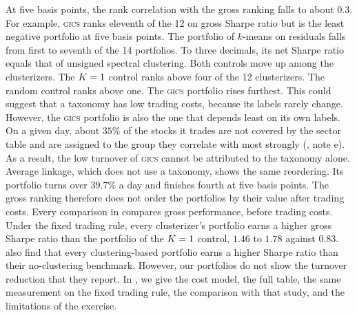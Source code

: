 At five basis points, the rank correlation with the gross ranking falls to about $0.3$. For example, \textsc{gics} ranks eleventh of the 12 on gross Sharpe ratio but is the least negative portfolio at five basis points. The portfolio of $k$-means on residuals falls from first to seventh of the 14 portfolios. To three decimals, its net Sharpe ratio equals that of unsigned spectral clustering. Both controls move up among the clusterizers. The $K=1$ control ranks above four of the 12 clusterizers. The random control ranks above one. The \textsc{gics} portfolio rises furthest. This could suggest that a taxonomy has low trading costs, because its labels rarely change. However, the \textsc{gics} portfolio is also the one that depends least on its own labels. On a given day, about $35\%$ of the stocks it trades are not covered by the sector table and are assigned to the group they correlate with most strongly (, note e). As a result, the
low turnover of \textsc{gics} cannot be attributed to the taxonomy alone. Average linkage, which does not use a taxonomy, shows the same reordering. Its portfolio turns over $39.7\%$ a day and finishes fourth at five basis points. The gross ranking therefore does not order the portfolios by their value after trading costs. Every comparison in  compares gross performance, before trading costs. Under the fixed trading rule, every clusterizer's portfolio earns a higher gross Sharpe ratio than the portfolio of the $K=1$ control, $1.46$ to $1.78$ against $0.83$. \citet{brutti2026orthogonal} also find that every clustering-based portfolio earns a higher Sharpe ratio than their no-clustering benchmark. However, our portfolios do not show the turnover reduction that they report. In , we give the cost model, the full table, the same measurement on the fixed trading rule, the comparison with that study, and the limitations of the exercise.

